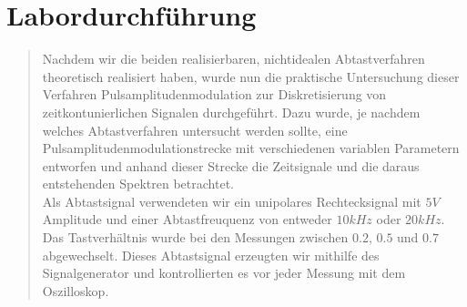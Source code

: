 
    
    \section{Labordurchführung}
    \begin{quote}
         
         Nachdem wir die beiden realisierbaren, nichtidealen Abtastverfahren
         theoretisch realisiert haben, wurde nun die praktische Untersuchung
         dieser Verfahren Pulsamplitudenmodulation zur Diskretisierung von
         zeitkontunierlichen Signalen durchgeführt. Dazu wurde, je nachdem
         welches Abtastverfahren untersucht werden sollte, eine
         Pulsamplitudenmodulationstrecke mit verschiedenen variablen Parametern
         entworfen und anhand dieser Strecke die Zeitsignale und die daraus
         entstehenden Spektren betrachtet.\\
         
         Als Abtastsignal verwendeten wir ein unipolares Rechtecksignal mit $5V$
         Amplitude und einer Abtastfreuquenz von entweder $10 kHz$ oder $20
         kHz$. Das Tastverhältnis wurde bei den Messungen zwischen $0.2$, $0.5$
         und $0.7$ abgewechselt. Dieses Abtastsignal erzeugten wir mithilfe des
         Signalgenerator und kontrollierten es vor jeder Messung mit dem
         Oszilloskop.\\
         

\end{quote}
